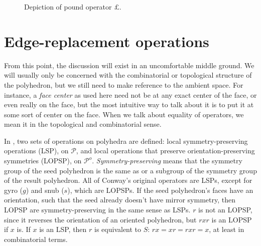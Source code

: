 \documentclass{amsart}[12pt]
\begin{document}
\begin{figure}

\caption{Depiction of pound operator $\pounds$.}
\label{fig:pound}
\end{figure}

\section{Edge-replacement operations}
From this point, the discussion will exist in an uncomfortable middle ground.
We will usually only be concerned with the combinatorial or topological
structure of the polyhedron, but we still need to make reference to the ambient
space. For instance, a \textit{face center} as used here need not be at any
exact center of the face, or even really on the face, but the most intuitive
way to talk about it is to put it at some sort of center on the face. When we
talk about equality of operators, we mean it in the topological and combinatorial sense.

In \cite{brinkmann}, two sets of operations on polyhedra are defined: local
symmetry-preserving operations (LSP), on $\mathcal{P}$, and local operations
that preserve orientation-preserving symmetries (LOPSP), on $\mathcal{P}^o$.
\textit{Symmetry-preserving} means that the symmetry group of the seed
polyhedron is the same as or a subgroup of the symmetry group of the result
polyhedron. All of Conway's original operators are LSPs,
except for gyro ($g$) and snub ($s$), which are LOPSPs. If the seed
polyhedron's faces have an orientation, such that the seed already doesn't
have mirror symmetry, then LOPSP are symmetry-preserving in the same sense as
LSPs. $r$ is not an LOPSP, since it reverses the orientation of an oriented
polyhedron, but $rxr$ is an LOPSP if $x$ is. If $x$ is an LSP, then $r$ is
equivalent to $S$: $rx = xr = rxr = x$, at least in combinatorial terms.
\end{document}
